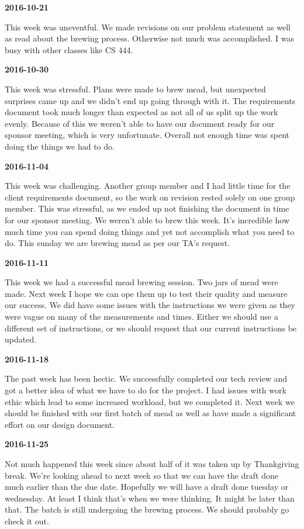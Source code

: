 \textbf{2016-10-21} 

This week was uneventful. We made revisions on our problem statement as well as read about the brewing process. Otherwise not much was accomplished. I was busy with other classes like CS 444.

\textbf{2016-10-30} 

This week was stressful. Plans were made to brew mead, but unexpected surprises came up and we didn't end up going through with it. The requirements document took much longer than expected as not all of us split up the work evenly. Because of this we weren't able to have our document ready for our sponsor meeting, which is very unfortunate. Overall not enough time was spent doing the things we had to do.

\textbf{2016-11-04} 

This week was challenging. Another group member and I had little time for the client requirements document, so the work on revision rested solely on one group member. This was stressful, as we ended up not finishing the document in time for our sponsor meeting. We weren't able to brew this week. It's incredible how much time you can spend doing things and yet not accomplish what you need to do. This sunday we are brewing mead as per our TA's request. 

\textbf{2016-11-11} 

This week we had a successful mead brewing session. Two jars of mead were made. Next week I hope we can ope them up to test their quality and measure our success. We did have some issues with the instructions we were given as they were vague on many of the measurements and times. Either we should use a different set of instructions, or we should request that our current instructions be updated.

\textbf{2016-11-18} 

The past week has been hectic. We successfully completed our tech review and got a better idea of what we have to do for the project. I had issues with work ethic which lead to some increased workload, but we completed it. Next week we should be finished with our first batch of mead as well as have made a significant effort on our design document.

\textbf{2016-11-25} 

Not much happened this week since about half of it was taken up by Thankgiving break. We're looking ahead to next week so that we can have the draft done much earlier than the due date. Hopefully we will have a draft done tuesday or wednesday. At least I think that's when we were thinking. It might be later than that. The batch is still undergoing the brewing process. We should probably go check it out.

